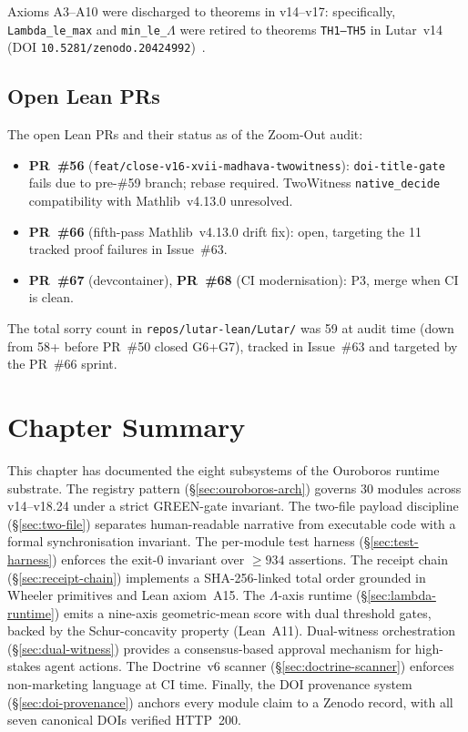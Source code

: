 Axioms A3--A10 were discharged to theorems in v14--v17: specifically,
\texttt{Lambda\_le\_max} and \texttt{min\_le\_\(\Lambda\)} were retired to theorems
\texttt{TH1--TH5} in Lutar~v14 (DOI \texttt{10.5281/zenodo.20424992})~\cite{lutar_v14_doi}.

\subsection{Open Lean PRs}
\label{ssec:lean-prs}

The open Lean PRs and their status as of the Zoom-Out audit:

\begin{itemize}
  \item \textbf{PR~\#56} (\texttt{feat/close-v16-xvii-madhava-twowitness}):
    \texttt{doi-title-gate} fails due to pre-\#59 branch; rebase required.
    TwoWitness \texttt{native\_decide} compatibility with Mathlib~v4.13.0
    unresolved.
  \item \textbf{PR~\#66} (fifth-pass Mathlib~v4.13.0 drift fix): open,
    targeting the 11 tracked proof failures in Issue~\#63.
  \item \textbf{PR~\#67} (devcontainer), \textbf{PR~\#68} (CI modernisation):
    P3, merge when CI is clean.
\end{itemize}

The total sorry count in \texttt{repos/lutar-lean/Lutar/} was 59 at audit
time (down from 58+ before PR~\#50 closed G6+G7), tracked in Issue~\#63
and targeted by the PR~\#66 sprint.

\section{Chapter Summary}
\label{sec:runtime-summary}

This chapter has documented the eight subsystems of the Ouroboros runtime
substrate.  The registry pattern (\S\ref{sec:ouroboros-arch}) governs 30
modules across v14--v18.24 under a strict GREEN-gate invariant.  The
two-file payload discipline (\S\ref{sec:two-file}) separates human-readable
narrative from executable code with a formal synchronisation invariant.
The per-module test harness (\S\ref{sec:test-harness}) enforces the exit-0
invariant over $\geq 934$ assertions.  The receipt chain
(\S\ref{sec:receipt-chain}) implements a SHA-256-linked total order grounded
in Wheeler primitives and Lean axiom~A15.  The \(\Lambda\)-axis runtime
(\S\ref{sec:lambda-runtime}) emits a nine-axis geometric-mean score with
dual threshold gates, backed by the Schur-concavity property (Lean~A11).
Dual-witness orchestration (\S\ref{sec:dual-witness}) provides a
consensus-based approval mechanism for high-stakes agent actions.  The
Doctrine~v6 scanner (\S\ref{sec:doctrine-scanner}) enforces
non-marketing language at CI time.  Finally, the DOI provenance system
(\S\ref{sec:doi-provenance}) anchors every module claim to a Zenodo record,
with all seven canonical DOIs verified HTTP~200.

